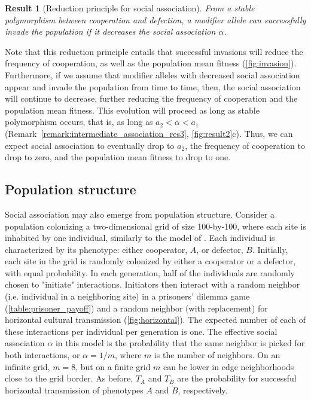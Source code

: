 \documentclass[12pt]{extarticle}
\newtheorem{result}{Result}
\begin{document}
\begin{result}[Reduction principle for social association] 
\label{result:evol_social_association}
From a stable polymorphism between cooperation and defection, a modifier allele can successfully invade the population if it decreases the social association $\alpha$.
\end{result}

Note that this reduction principle entails that successful invasions will reduce the frequency of cooperation, as well as the population mean fitness (\autoref{fig:invasion}).
Furthermore, if we assume that modifier alleles with decreased social association appear and invade the population from time to time, then, the social association will continue to decrease, further reducing the frequency of cooperation and the population mean fitness. This evolution will proceed as long as stable polymorphism occurs, that is, as long as $a_2 < \alpha < a_1$ (Remark~\ref{remark:intermediate_association_res3}, \autoref{fig:result2}c). 
Thus, we can expect social association to eventually drop to $a_2$, the frequency of cooperation to drop to zero, and the population mean fitness to drop to one.


\subsection*{Population structure}

Social association may also emerge from population structure.
Consider a  population colonizing a two-dimensional grid of size 100-by-100, where each site is inhabited by one individual, similarly to the model of \citet{lewin2020rockpaperscissors}.
Each individual is characterized by its phenotype: either cooperator, $A$, or defector, $B$.
Initially, each site in the grid is randomly colonized by either a cooperator or a defector, with equal probability.
In each generation, half of the individuals are randomly chosen to "initiate" interactions.
Initiators then interact with a random neighbor (i.e. individual in a neighboring site) in a prisoners' dilemma game (\autoref{table:prisoner_payoff}) and a random neighbor (with replacement) for horizontal cultural transmission (\autoref{fig:horizontal}).
The expected number of each of these interactions per individual per generation is one.
The effective social association $\alpha$ in this model is the probability that the same neighbor is picked for both interactions, or $\alpha=1/m$, where $m$ is the number of neighbors.
On an infinite grid, $m=8$, but on a finite grid $m$ can be lower in edge neighborhoods close to the grid border.
As before, $T_A$ and $T_B$ are the probability for successful horizontal transmission of phenotypes $A$ and $B$, respectively.
\end{document}
